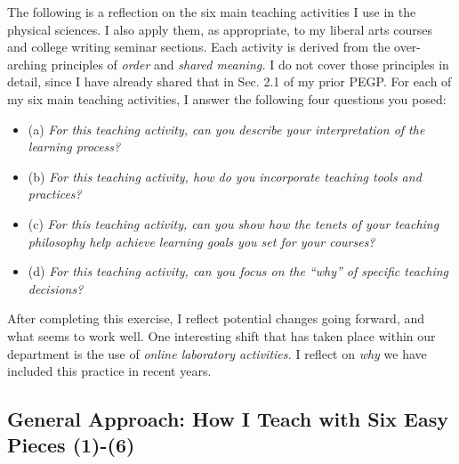 \documentclass[../../../main.tex]{subfiles}
\begin{document}
The following is a reflection on the six main teaching activities I use in the physical sciences.  I also apply them, as appropriate, to my liberal arts courses and college writing seminar sections.  Each activity is derived from the over-arching principles of \textit{order} and \textit{shared meaning.}  I do not cover those principles in detail, since I have already shared that in Sec. 2.1 of my prior PEGP.  For each of my six main teaching activities, I answer the following four questions you posed:
\begin{itemize}
\item (a) \textit{For this teaching activity, can you describe your interpretation of the learning process?}
\item (b) \textit{For this teaching activity, how do you incorporate teaching tools and practices?}
\item (c) \textit{For this teaching activity, can you show how the tenets of your teaching philosophy help achieve learning goals you set for your courses?}
\item (d) \textit{For this teaching activity, can you focus on the ``why'' of specific teaching decisions?}
\end{itemize} 
After completing this exercise, I reflect potential changes going forward, and what seems to work well.  One interesting shift that has taken place within our department is the use of \textit{online laboratory activities.}  I reflect on \textit{why} we have included this practice in recent years.

\subsection{General Approach: How I Teach with Six Easy Pieces (1)-(6)}
\end{document}
